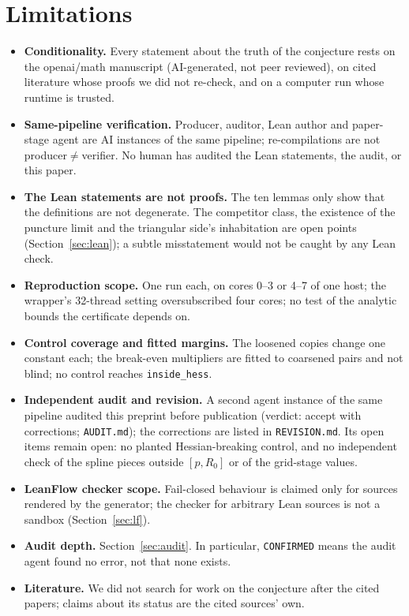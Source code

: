 \documentclass[10pt]{article}
\begin{document}
\section{Limitations}\label{sec:lim}
\begin{itemize}
\item \textbf{Conditionality.} Every statement about the truth of the conjecture rests on the openai/math manuscript (AI-generated, not peer reviewed), on cited literature whose proofs we did not re-check, and on a computer run whose runtime is trusted.
\item \textbf{Same-pipeline verification.} Producer, auditor, Lean author and paper-stage agent are AI instances of the same pipeline; re-compilations are not producer$\neq$verifier. No human has audited the Lean statements, the audit, or this paper.
\item \textbf{The Lean statements are not proofs.} The ten lemmas only show that the definitions are not degenerate. The competitor class, the existence of the puncture limit and the triangular side's inhabitation are open points (Section~\ref{sec:lean}); a subtle misstatement would not be caught by any Lean check.
\item \textbf{Reproduction scope.} One run each, on cores 0--3 or 4--7 of one host; the wrapper's 32-thread setting oversubscribed four cores; no test of the analytic bounds the certificate depends on.
\item \textbf{Control coverage and fitted margins.} The loosened copies change one constant each; the break-even multipliers are fitted to coarsened pairs and not blind; no control reaches \texttt{inside\_hess}.
\item \textbf{Independent audit and revision.} A second agent instance of the same pipeline audited this preprint before publication (verdict: accept with corrections; \texttt{AUDIT.md}); the corrections are listed in \texttt{REVISION.md}. Its open items remain open: no planted Hessian-breaking control, and no independent check of the spline pieces outside $[p,R_0]$ or of the grid-stage values.
\item \textbf{LeanFlow checker scope.} Fail-closed behaviour is claimed only for sources rendered by the generator; the checker for arbitrary Lean sources is not a sandbox (Section~\ref{sec:lf}).
\item \textbf{Audit depth.} Section~\ref{sec:audit}. In particular, \texttt{CONFIRMED} means the audit agent found no error, not that none exists.
\item \textbf{Literature.} We did not search for work on the conjecture after the cited papers; claims about its status are the cited sources' own.
\end{itemize}
\end{document}
